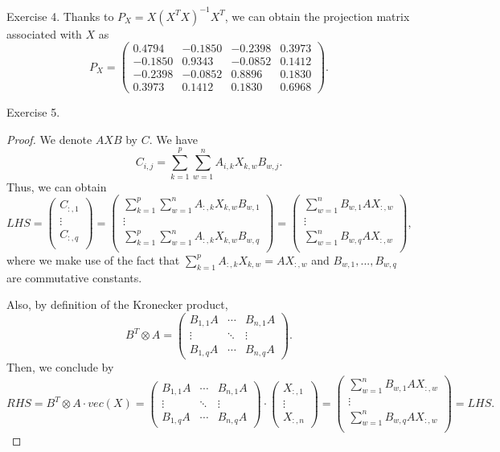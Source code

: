 \documentclass{article}
\begin{document}
\begin{section}{Exercise 4.}
Thanks to $P_X = X(X^TX)^{-1}X^T$, we can obtain the projection matrix associated with $X$ as
$$
P_X = \begin{pmatrix}
    0.4794 &  -0.1850 &  -0.2398  &  0.3973\\
   -0.1850  &  0.9343 &  -0.0852  &  0.1412\\
   -0.2398 &  -0.0852  &  0.8896 &   0.1830\\
    0.3973 &  0.1412  &  0.1830  &  0.6968
\end{pmatrix} .
$$
\end{section}

\begin{section}{Exercise 5.}
\begin{proof}
We denote $AXB$ by $C$. We have 
$$
C_{i,j} = \sum_{k=1}^{p}\sum_{w=1}^{n}A_{i,k}X_{k,w}B_{w,j}.
$$
Thus, we can obtain
$$
LHS = \begin{pmatrix}
C_{:,1} \\
\vdots \\
C_{:,q}\\
\end{pmatrix}
=
\begin{pmatrix}
\sum_{k=1}^{p}\sum_{w=1}^{n}A_{:,k}X_{k,w}B_{w,1} \\
\vdots \\
\sum_{k=1}^{p}\sum_{w=1}^{n}A_{:,k}X_{k,w}B_{w,q}\\
\end{pmatrix}
=
\begin{pmatrix}
\sum_{w=1}^{n}B_{w,1}AX_{:,w} \\
\vdots \\
\sum_{w=1}^{n}B_{w,q}AX_{:,w}\\
\end{pmatrix},
$$
where we make use of the fact that $\sum_{k=1}^{p}A_{:,k}X_{k,w} = AX_{:,w} $ and $B_{w,1},...,B_{w,q}$ are commutative constants.

Also, by definition of the Kronecker product,
$$
B^T\otimes A = 
\begin{pmatrix}
B_{1,1}A &  \cdots & B_{n,1}A \\
\vdots & \ddots & \vdots \\
B_{1,q}A & \cdots & B_{n,q}A
\end{pmatrix}.
$$
Then, we conclude by
$$
RHS = B^T\otimes A\cdot vec(X) =
\begin{pmatrix}
B_{1,1}A &  \cdots & B_{n,1}A \\
\vdots & \ddots & \vdots \\
B_{1,q}A & \cdots & B_{n,q}A
\end{pmatrix}\cdot
\begin{pmatrix}
X_{:,1}\\
\vdots \\
X_{:,n}
\end{pmatrix}
=
\begin{pmatrix}
\sum_{w=1}^{n} B_{w,1}AX_{:,w} \\
\vdots \\
\sum_{w=1}^{n} B_{w,q}AX_{:,w}\\
\end{pmatrix} 
= LHS.
$$
\end{proof}
\end{section}
\end{document}

